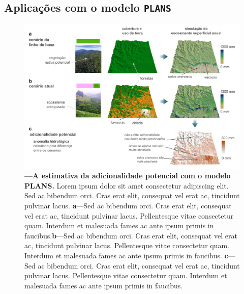 \documentclass[./main.tex]{subfiles}
\begin{document}
\subsection{Aplicações com o modelo \texttt{PLANS}}

\begin{figure}[t!] 
\centering				
\includegraphics[width=0.98\linewidth]{figs/fig_addplans.jpg}		
\caption[Lorem ipsum dolor sit amet]
{\textbf{---\;A estimativa da adicionalidade potencial com o modelo PLANS.}
    Lorem ipsum dolor sit amet consectetur adipiscing elit. Sed ac bibendum orci. Cras erat elit, consequat vel erat ac, tincidunt pulvinar lacus. \;\textbf{a}\;---\;Sed ac bibendum orci. Cras erat elit, consequat vel erat ac, tincidunt pulvinar lacus. Pellentesque vitae consectetur quam. Interdum et malesuada fames ac ante ipsum primis in faucibus.\;\textbf{b}\;---\;Sed ac bibendum orci. Cras erat elit, consequat vel erat ac, tincidunt pulvinar lacus. Pellentesque vitae consectetur quam. Interdum et malesuada fames ac ante ipsum primis in faucibus. \;\textbf{c}\;---\;Sed ac bibendum orci. Cras erat elit, consequat vel erat ac, tincidunt pulvinar lacus. Pellentesque vitae consectetur quam. Interdum et malesuada fames ac ante ipsum primis in faucibus.
}
\label{fig:eco:addplans1} 		
\end{figure}
\end{document}

